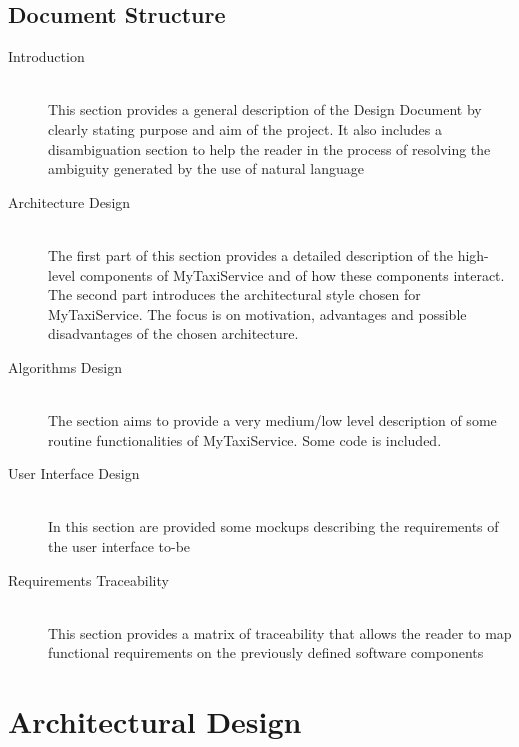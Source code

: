\documentclass[11pt,titlepage]{article} %
\begin{document}
\subsection{Document Structure}
	\begin{description}
	     \item [Introduction] \hfill \\
	      This section provides a general description of the Design Document by clearly stating purpose and aim of the project.
	      It also includes a disambiguation section to help the reader in the process of resolving the ambiguity generated by
	      the use of natural language
	
	     \item [Architecture Design] \hfill \\
	      The first part of this section provides a detailed description of the high-level components of MyTaxiService and of how
	      these components interact.
	      The second part introduces the architectural style chosen for MyTaxiService. The focus is on motivation, advantages and possible
	      disadvantages of the chosen architecture.
	
	    \item [Algorithms Design] \hfill \\
	      The section aims to provide a very medium/low level description of some routine functionalities of MyTaxiService.
	      Some code is included.
	
	    \item [User Interface Design] \hfill \\
	      In this section are provided some mockups describing the requirements of the user interface to-be
	
	    \item [Requirements Traceability] \hfill \\
	      This section provides a matrix of traceability that allows the reader to map functional requirements on the
	      previously defined software components
	\end{description}

\newpage

\section{Architectural Design}
\end{document}
